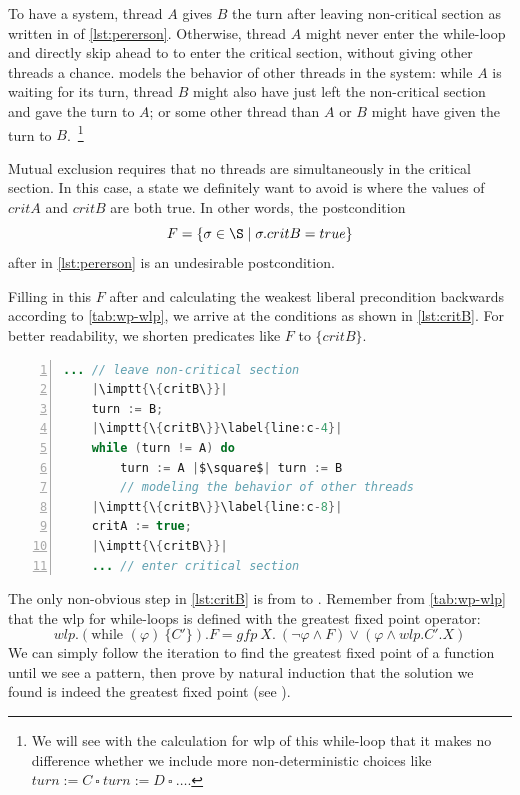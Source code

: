 To have a  system, thread $A$ gives $B$ the turn after leaving non-critical section as written in  of \autoref{lst:pererson}. 
Otherwise, thread $A$ might never enter the while-loop and directly skip ahead to  to enter the critical section, without giving other threads a chance. 
 models the behavior of other threads in the system: while $A$ is waiting for its turn, thread $B$ might also have just left the non-critical section and gave the turn to $A$; or some other thread than $A$ or $B$ might have given the turn to $B$.~\footnote{We will see with the calculation for wlp of this while-loop that it makes no difference whether we include more non-deterministic choices like $turn := C\ \square\ turn := D\ \square\ \dots$.} 

Mutual exclusion requires that no threads are simultaneously in the critical section. 
In this case, a state we definitely want to avoid is where the values of $critA$ and $critB$ are both true. 
In other words, the postcondition 
$$F=\{\sigma\in\S\mid \sigma.critB=true\}$$ 
after  in \autoref{lst:pererson} is an undesirable postcondition.

Filling in this $F$ after  and calculating the weakest liberal precondition backwards according to \autoref{tab:wp-wlp}, we arrive at the conditions as shown in \autoref{lst:critB}. 
For better readability, we shorten predicates like $F$ to $\{critB\}$.

\begin{lstlisting}[caption={Weakest Liberal Precondition w.r.t Postcondition $F=\{\sigma\in\S\mid \sigma.critB=true\}$ }, label={lst:critB}, language=java, numbers=left, stepnumber=1, captionpos=b,escapechar=|,frame=single]
	... // leave non-critical section
	|\imptt{\{critB\}}|
	turn := B;
	|\imptt{\{critB\}}\label{line:c-4}|
	while (turn != A) do 
		turn := A |$\square$| turn := B 
		// modeling the behavior of other threads
	|\imptt{\{critB\}}\label{line:c-8}|
	critA := true;
	|\imptt{\{critB\}}|
	... // enter critical section  
\end{lstlisting}

The only non-obvious step in \autoref{lst:critB} is from  to . 
Remember from \autoref{tab:wp-wlp} that the wlp for while-loops is defined with the greatest fixed point operator: 
\[
	wlp.(\text{while }(\varphi)\ \{C'\}).F = gfp\ X.\ (\neg\varphi\wedge F)\vee(\varphi\wedge wlp.C'.X)
\]
We can simply follow the iteration to find the greatest fixed point of a function until we see a pattern, then prove by natural induction that the solution we found is indeed the greatest fixed point (see ).

